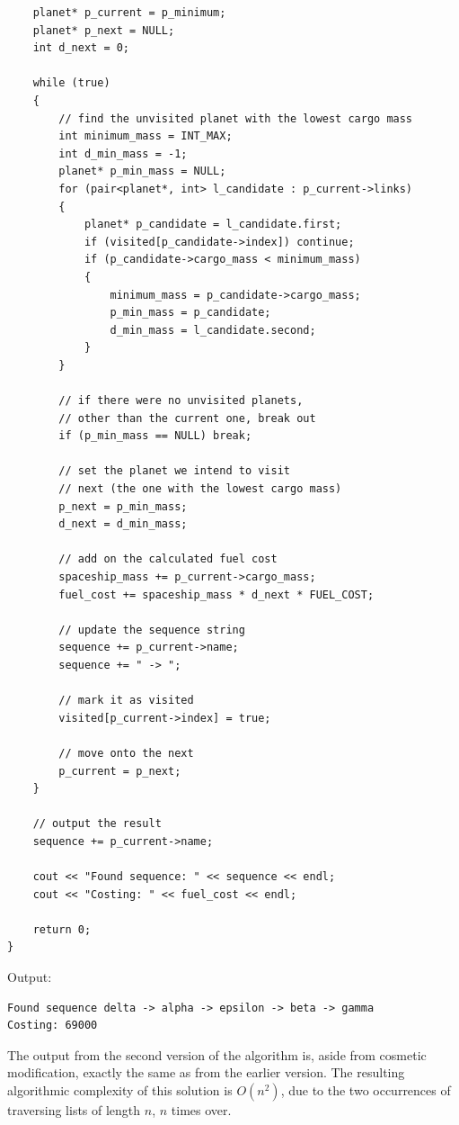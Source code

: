 \documentclass[
]{article}
\begin{document}
\begin{verbatim}
    planet* p_current = p_minimum;
    planet* p_next = NULL;
    int d_next = 0;

    while (true)
    {
        // find the unvisited planet with the lowest cargo mass
        int minimum_mass = INT_MAX;
        int d_min_mass = -1;
        planet* p_min_mass = NULL;
        for (pair<planet*, int> l_candidate : p_current->links)
        {
            planet* p_candidate = l_candidate.first;
            if (visited[p_candidate->index]) continue;
            if (p_candidate->cargo_mass < minimum_mass)
            {
                minimum_mass = p_candidate->cargo_mass;
                p_min_mass = p_candidate;
                d_min_mass = l_candidate.second;
            }
        }

        // if there were no unvisited planets,
        // other than the current one, break out
        if (p_min_mass == NULL) break;

        // set the planet we intend to visit
        // next (the one with the lowest cargo mass)
        p_next = p_min_mass;
        d_next = d_min_mass;

        // add on the calculated fuel cost
        spaceship_mass += p_current->cargo_mass;
        fuel_cost += spaceship_mass * d_next * FUEL_COST;

        // update the sequence string
        sequence += p_current->name;
        sequence += " -> ";

        // mark it as visited
        visited[p_current->index] = true;

        // move onto the next
        p_current = p_next;
    }

    // output the result
    sequence += p_current->name;

    cout << "Found sequence: " << sequence << endl;
    cout << "Costing: " << fuel_cost << endl;

    return 0;
}
\end{verbatim}

Output:

\begin{verbatim}
Found sequence delta -> alpha -> epsilon -> beta -> gamma
Costing: 69000
\end{verbatim}

The output from the second version of the algorithm is, aside from
cosmetic modification, exactly the same as from the earlier version. The
resulting algorithmic complexity of this solution is \(O(n^2)\), due to
the two occurrences of traversing lists of length \(n\), \(n\) times
over.
\end{document}
